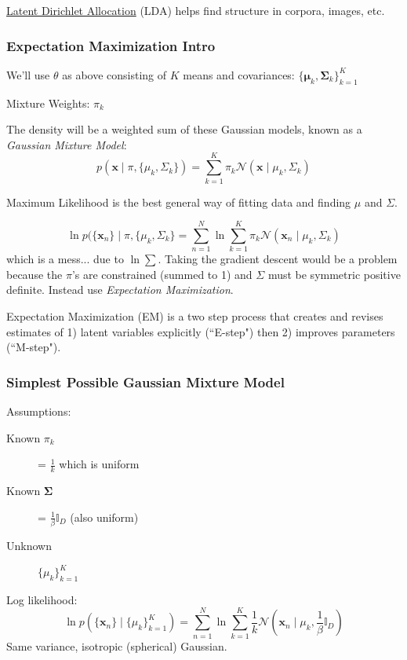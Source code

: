 \documentclass[11pt, oneside]{article}   	%
\begin{document}
\href{http://en.wikipedia.org/wiki/Latent_Dirichlet_allocation}{Latent Dirichlet Allocation} (LDA) helps find structure in corpora, images, etc.

\subsubsection{Expectation Maximization Intro}

We'll use $\theta$ as above consisting of $K$ means and covariances: $\{\boldsymbol{\mu}_k,\mathbf{\Sigma}_k\}_{k=1}^K$

Mixture Weights: $\pi_k$

The density will be a weighted sum of these Gaussian models, known as a \emph{Gaussian Mixture Model}:
\[
p(\mathbf{x} \mid \pi, \{\mu_k, \Sigma_k\}) = \sum_{k=1}^K \pi_k\mathcal{N}(\mathbf{x} \mid \mu_k, \Sigma_k)
\]

Maximum Likelihood is the best general way of fitting data and finding $\mu$ and $\Sigma$.

\[
\ln p(\{\mathbf{x}_n\} \mid \pi, \{ \mu_k, \Sigma_k\} = \sum_{n=1}^N \ln \sum_{k=1}^K \pi_k \mathcal{N}(\mathbf{x}_n\mid \mu_k, \Sigma_k)
\]
which is a mess... due to $\ln \sum$. Taking the gradient descent would be a problem because the $\pi$'s are constrained (summed to 1) and $\Sigma$ must be symmetric positive definite. Instead use \emph{Expectation Maximization}.

Expectation Maximization (EM) is a two step process that creates and revises estimates of 1) latent variables explicitly (``E-step") then  2) improves parameters (``M-step").

\subsubsection{Simplest Possible Gaussian Mixture Model}

Assumptions:
\begin{description}
	\item[Known $\pi_k$] = $\frac{1}{k}$ which is uniform \\
	\item[Known $\mathbf{\Sigma}$] = $\frac{1}{\beta} \mathbb{I}_D$ (also uniform)
	\item[Unknown] $\{ \mu_k \}_{k=1}^K$
\end{description}

Log likelihood:
\[
\ln p(\{\mathbf{x}_n\} \mid \{ \mu_k \}_{k=1}^K) = \sum_{n=1}^N \ln \sum_{k=1}^K \frac{1}{k} \mathcal{N}(\mathbf{x}_n\mid \mu_k, \frac{1}{\beta}\mathbb{I}_D)
\]
Same variance, isotropic (spherical) Gaussian. 
\end{document}

